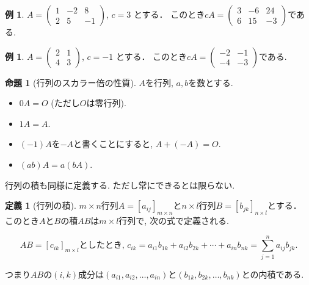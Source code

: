\documentclass[dvipdfmx,a4paper,11pt]{article}
\theoremstyle{definition}
\newtheorem{prop}[thm]{命題}
\newtheorem{dfn}[thm]{定義}
\newtheorem{exa}[thm]{例}
\begin{document}
\begin{exa}
 $A = 
 \begin{pmatrix}
 1 &-2&8 \\
 2&5&-1
 \end{pmatrix}
 $,
 $
 c =3
 $
 とする．
 このとき$
 cA =
 \begin{pmatrix}
 3 &-6&24 \\
 6&15&-3
 \end{pmatrix}
 $である.
 \end{exa}
 \begin{exa}
 $A = 
 \begin{pmatrix}
 2&1 \\
 4&3
 \end{pmatrix}
 $, 
 $
 c =-1
 $
 とする．
 このとき$
 cA =
 \begin{pmatrix}
 -2 &-1 \\
-4&-3
 \end{pmatrix}
 $である.
 \end{exa}
 

 
 \begin{tcolorbox}[
    colback = white,
    colframe = green!35!black,
    fonttitle = \bfseries,
    breakable = true]
    \begin{prop}[行列のスカラー倍の性質]
$A$を行列, $a,b$を数とする.
 \begin{itemize}
 	\setlength{\parskip}{0cm}
  	\setlength{\itemsep}{0pt} 
 \item $0A =O$ (ただし$O$は零行列).
  \item $1A=A$. 
  \item $(-1)A$を$-A$と書くことにすると, $A + (-A) =O$.　
  \item $(ab) A = a(bA)$.
 \end{itemize}
  \end{prop}
 \end{tcolorbox}
 
行列の積も同様に定義する. 
ただし常にできるとは限らない. 


\begin{tcolorbox}[
    colback = white,
    colframe = green!35!black,
    fonttitle = \bfseries,
    breakable = true]
    \begin{dfn}[行列の積]
    
 $m \times n$行列$A = [a_{ij}]_{m \times n}$と$n \times l$行列$B= [b_{jk}]_{n \times l}$とする．
このとき$A$と$B$の積$AB$は$m \times l$行列で, 次の式で定義される.

$$
AB = [c_{ik}]_{m \times l}\text{としたとき, }
c_{ik} = a_{i1}b_{1k} + a_{i2}b_{2k} + \cdots + a_{in}b_{nk} = \sum_{j=1}^{n} a_{ij}b_{jk}.
$$

つまり$AB$の$(i,k)$成分は$(a_{i1}, a_{i2}, \ldots, a_{in})$と$(b_{1k}, b_{2k}, \ldots, b_{nk})$との内積である. 
  \end{dfn}
 \end{tcolorbox}
 
\end{document}
